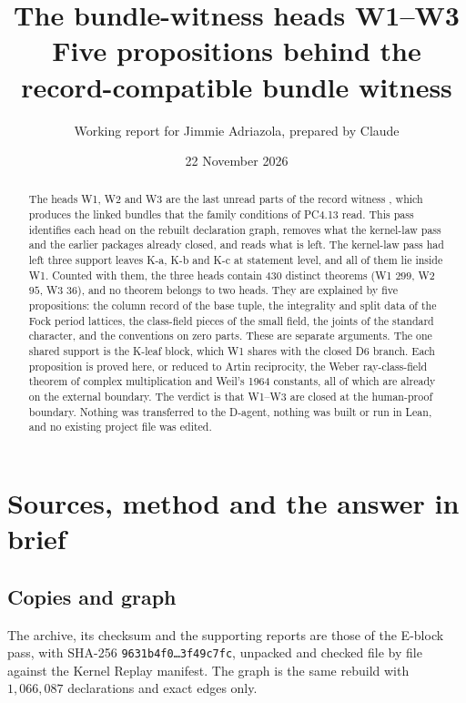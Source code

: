 \documentclass[11pt]{article}
\title{The bundle-witness heads W1--W3\\ Five propositions behind the record-compatible bundle witness}
\author{Working report for Jimmie Adriazola, prepared by Claude}
\date{22 November 2026}
\theoremstyle{remark}
\begin{document}
\maketitle

\begin{abstract}
The heads W1, W2 and W3 are the last unread parts of the record witness , which produces the linked bundles that the family conditions of PC4.13 read. This pass identifies each head on the rebuilt declaration graph, removes what the kernel-law pass and the earlier packages already closed, and reads what is left. The kernel-law pass had left three support leaves K-a, K-b and K-c at statement level, and all of them lie inside W1. Counted with them, the three heads contain $430$ distinct theorems (W1 $299$, W2 $95$, W3 $36$), and no theorem belongs to two heads. They are explained by five propositions: the column record of the base tuple, the integrality and split data of the Fock period lattices, the class-field pieces of the small field, the joints of the standard character, and the conventions on zero parts. These are separate arguments. The one shared support is the K-leaf block, which W1 shares with the closed D6 branch. Each proposition is proved here, or reduced to Artin reciprocity, the Weber ray-class-field theorem of complex multiplication and Weil's 1964 constants, all of which are already on the external boundary. The verdict is that W1--W3 are closed at the human-proof boundary. Nothing was transferred to the D-agent, nothing was built or run in Lean, and no existing project file was edited.
\end{abstract}

\tableofcontents

\section{Sources, method and the answer in brief}

\subsection{Copies and graph}
The archive, its checksum and the supporting reports are those of the E-block pass,  with SHA-256 \texttt{9631b4f0\ldots 3f49c7fc}, unpacked and checked file by file against the Kernel Replay manifest. The graph is the same rebuild with $1{,}066{,}087$ declarations and exact edges only.
\end{document}
